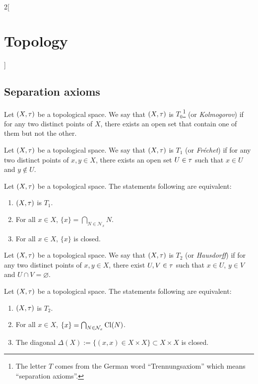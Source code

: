\documentclass[../../../main.tex]{subfiles}
\begin{document}
\begin{multicols}{2}[\section{Topology}]
  \subsection{Separation axioms}
  \begin{definition}[$T_0$ space]
    Let $(X,\tau)$ be a topological space. We say that $(X,\tau)$ is $T_0$\footnote{The letter $T$ comes from the German word ``Trennungsaxiom'' which means ``separation axioms''.} (or \textit{Kolmogorov}) if for any two distinct points of $X$, there exists an open set that contain one of them but not the other.
  \end{definition}
  \begin{definition}[$T_1$ space]
    Let $(X,\tau)$ be a topological space. We say that $(X,\tau)$ is $T_1$ (or \textit{Fréchet}) if for any two distinct points of $x,y\in X$, there exists an open set $U\in\tau$ such that $x\in U$ and $y\notin U$.
  \end{definition}
  \begin{theorem}
    Let $(X,\tau)$ be a topological space. The statements following are equivalent:
    \begin{enumerate}
      \item $(X,\tau)$ is $T_1$.
      \item For all $x\in X$, $\{x\}=\bigcap_{N\in \mathcal{N}_x}N$.
      \item For all $x\in X$, $\{x\}$ is closed.
    \end{enumerate}
  \end{theorem}
  \begin{definition}[$T_2$ space]
    Let $(X,\tau)$ be a topological space. We say that $(X,\tau)$ is $T_2$ (or \textit{Hausdorff}) if for any two distinct points of $x,y\in X$, there exist $U,V\in\tau$ such that $x\in U$, $y\in V$ and $U\cap V=\varnothing$.
  \end{definition}
  \begin{theorem}
    Let $(X,\tau)$ be a topological space. The statements following are equivalent:
    \begin{enumerate}
      \item $(X,\tau)$ is $T_2$.
      \item For all $x\in X$, $\{x\}=\bigcap_{N\in \mathcal{N}_x}\operatorname{Cl}(N)$.
      \item The diagonal $\Delta(X):=\{(x,x)\in X\times X\}\subset X\times X$ is closed.
    \end{enumerate}
  \end{theorem}
  \begin{definition}

\end{definition}
\end{multicols}
\end{document}
